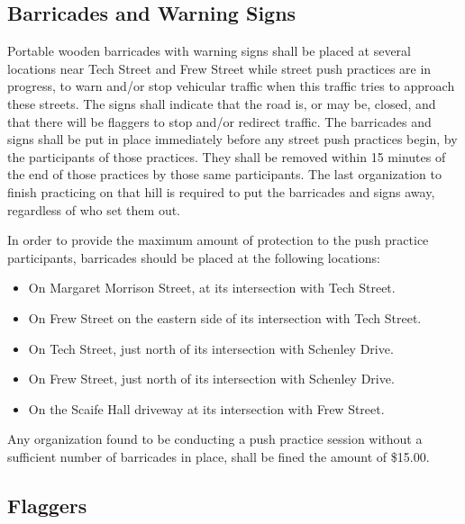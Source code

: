 \subsection{Barricades and Warning Signs}

	Portable wooden barricades with warning signs shall be placed at several
	locations near Tech Street and Frew Street while street push practices are in
	progress, to warn and/or stop vehicular traffic when this traffic tries to
	approach these streets. The signs shall indicate that the road is, or may be,
	closed, and that there will be flaggers to stop and/or redirect traffic. The
	barricades and signs shall be put in place immediately before any street push
	practices begin, by the participants of those practices. They shall be removed
	within 15 minutes of the end of those practices by those same participants.
	The last organization to finish practicing on that hill is required to put
	the barricades and signs away, regardless of who set them out.

	In order to provide the maximum amount of protection to the push practice
	participants, barricades should be placed at the following locations:

	\begin{itemize}

		\item On Margaret Morrison Street, at its intersection with Tech Street.

		\item On Frew Street on the eastern side of its intersection with Tech
		Street.

		\item On Tech Street, just north of its intersection with Schenley Drive.

		\item On Frew Street, just north of its intersection with Schenley Drive.

		\item On the Scaife Hall driveway at its intersection with Frew Street.

	\end{itemize}

	Any organization found to be conducting a push practice session without a
	sufficient number of barricades in place, shall be fined the amount of \$15.00.

\subsection{Flaggers}

